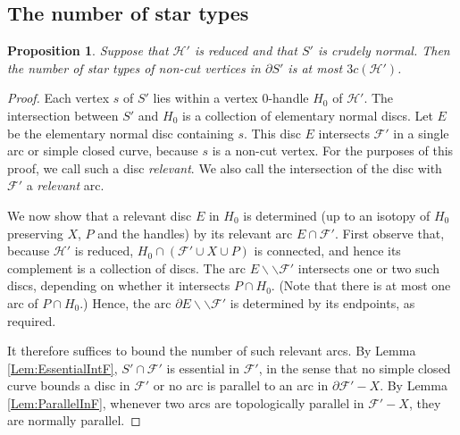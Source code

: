 \documentclass[oneside]{amsart}
\numberwithin{equation}{section}
\theoremstyle{plain}
\newtheorem{proposition}[equation]{Proposition}
\theoremstyle{definition}
\newcommand{\cut}{\backslash\backslash}
\newcommand{\calH}{\mathcal{H}}
\newcommand{\calF}{\mathcal{F}}
\begin{document}
\subsection{The number of star types}

\begin{proposition}
\label{Prop:StarTypeNonCut}
Suppose that $\mathcal{H}'$ is reduced and that
$S'$ is crudely normal.
Then the number of star types of non-cut vertices in $\partial S'$ is at most 
$3c(\mathcal{H}')$.
\end{proposition}

\begin{proof}
Each vertex $s$ of $S'$ lies within a vertex 0-handle $H_0$ of $\mathcal{H}'$. The intersection between
$S'$ and $H_0$ is a collection of elementary normal discs. Let $E$ be the elementary normal disc
containing $s$. This disc $E$
intersects $\mathcal{F}'$ in a single arc or simple closed curve, because $s$ is a non-cut vertex.
For the purposes of this proof, we call such a disc \emph{relevant}. We also call
the intersection of the disc with $\mathcal{F}'$ a \emph{relevant} arc.

We now show that a relevant disc $E$ in $H_0$ is determined (up to an isotopy of $H_0$
preserving $X$, $P$ and the handles) by its relevant arc $E \cap \calF'$. 
First observe that, because
$\calH'$ is reduced, $H_0 \cap (\calF' \cup X \cup P)$ is connected, and hence
its complement is a collection of discs. The arc $E \cut \calF'$ intersects one or two
such discs, depending on whether it intersects $P \cap H_0$. (Note that there
is at most one arc of $P \cap H_0$.) Hence, the arc $\partial E \cut \calF'$ is determined
by its endpoints, as required.

It therefore suffices to bound the number of such relevant arcs.
By Lemma \ref{Lem:EssentialIntF}, $S' \cap \mathcal{F}'$ is essential in $\calF'$, in the 
sense that no simple closed curve bounds a disc in $\calF'$ or no arc is parallel to
an arc in $\partial \calF' - X$. By Lemma \ref{Lem:ParallelInF}, whenever two
arcs are topologically parallel in $\calF' - X$, they are normally parallel. 


\end{proof}
\end{document}

